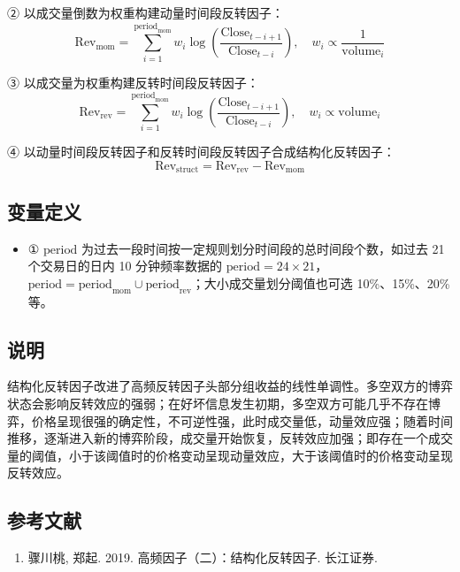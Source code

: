 \documentclass{article}
\begin{document}
② 以成交量倒数为权重构建动量时间段反转因子：
\begin{equation}
    \mathrm{Rev}_{\mathrm{mom}} = \sum_{i=1}^{\mathrm{period}_{\mathrm{mom}}} w_i \log \left( \frac{\mathrm{Close}_{t-i+1}}{\mathrm{Close}_{t-i}} \right), \quad w_i \propto \frac{1}{\mathrm{volume}_i}
\end{equation}

③ 以成交量为权重构建反转时间段反转因子：
\begin{equation}
    \mathrm{Rev}_{\mathrm{rev}} = \sum_{i=1}^{\mathrm{period}_{\mathrm{mom}}} w_i \log \left( \frac{\mathrm{Close}_{t-i+1}}{\mathrm{Close}_{t-i}} \right), \quad w_i \propto \mathrm{volume}_i
\end{equation}

④ 以动量时间段反转因子和反转时间段反转因子合成结构化反转因子：
\begin{equation}
    \mathrm{Rev}_{\mathrm{struct}} = \mathrm{Rev}_{\mathrm{rev}} - \mathrm{Rev}_{\mathrm{mom}}
\end{equation}

\subsection{变量定义}
\begin{itemize}
    \item ① \(\mathrm{period}\) 为过去一段时间按一定规则划分时间段的总时间段个数，如过去 21 个交易日的日内 10 分钟频率数据的 \(\mathrm{period}=24 \times 21\)，\(\mathrm{period} = \mathrm{period}_{\mathrm{mom}} \cup \mathrm{period}_{\mathrm{rev}}\)；大小成交量划分阈值也可选 10\%、15\%、20\% 等。
\end{itemize}

\subsection{说明}
结构化反转因子改进了高频反转因子头部分组收益的线性单调性。多空双方的博弈状态会影响反转效应的强弱；在好坏信息发生初期，多空双方可能几乎不存在博弈，价格呈现很强的确定性，不可逆性强，此时成交量低，动量效应强；随着时间推移，逐渐进入新的博弈阶段，成交量开始恢复，反转效应加强；即存在一个成交量的阈值，小于该阈值时的价格变动呈现动量效应，大于该阈值时的价格变动呈现反转效应。

\subsection{参考文献}
\begin{enumerate}
    \item 骤川桃, 郑起. 2019. 高频因子（二）：结构化反转因子. 长江证券.
\end{enumerate}
\end{document}
